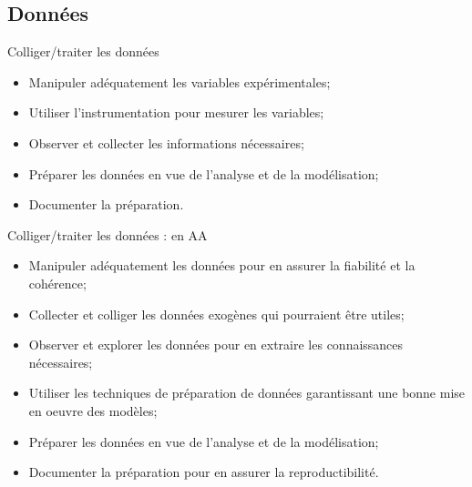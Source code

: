 \documentclass[french]{beamer}
\begin{document}
\subsection{Données}
\begin{frame}{Colliger/traiter les données}
	\begin{itemize}
		\item Manipuler adéquatement les variables expérimentales;
		\item Utiliser l’instrumentation pour mesurer les variables;
		\item Observer et collecter les informations nécessaires;
		\item Préparer les données en vue de l’analyse et de la modélisation;
		\item Documenter la préparation.
	\end{itemize}
\end{frame}

\begin{frame}{Colliger/traiter les données : en AA}
\begin{itemize}
	\item Manipuler adéquatement les données pour en assurer la fiabilité et la cohérence;
	\item Collecter et colliger les données exogènes qui pourraient être utiles;
	\item Observer et explorer les données pour en extraire les connaissances nécessaires;
	\item Utiliser les techniques de préparation de données garantissant une bonne mise en oeuvre des modèles;
	\item Préparer les données en vue de l’analyse et de la modélisation;
	\item Documenter la préparation pour en assurer la reproductibilité.
\end{itemize}
\end{frame}
\end{document}
